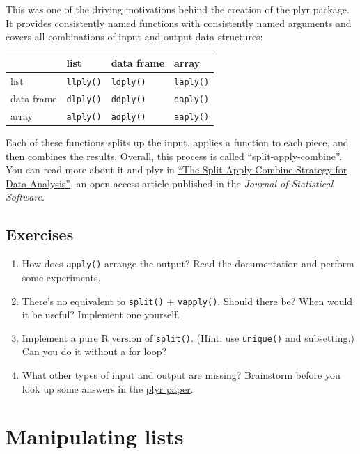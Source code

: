 This was one of the driving motivations behind the creation of the plyr
package. It provides consistently named functions with consistently
named arguments and covers all combinations of input and output data
structures:

\begin{longtable}[]{@{}llll@{}}
\toprule
& list & data frame & array\tabularnewline
\midrule
\endhead
list & \texttt{llply()} & \texttt{ldply()} &
\texttt{laply()}\tabularnewline
data frame & \texttt{dlply()} & \texttt{ddply()} &
\texttt{daply()}\tabularnewline
array & \texttt{alply()} & \texttt{adply()} &
\texttt{aaply()}\tabularnewline
\bottomrule
\end{longtable}

Each of these functions splits up the input, applies a function to each
piece, and then combines the results. Overall, this process is called
``split-apply-combine''. You can read more about it and plyr in
\href{http://www.jstatsoft.org/v40/i01/}{``The Split-Apply-Combine
Strategy for Data Analysis''}, an open-access article published in the
\emph{Journal of Statistical Software}.

\hypertarget{exercises-2}{%
\subsection{Exercises}\label{exercises-2}}

\begin{enumerate}
\def\labelenumi{\arabic{enumi}.}
\item
  How does \texttt{apply()} arrange the output? Read the documentation
  and perform some experiments.
\item
  There's no equivalent to \texttt{split()} + \texttt{vapply()}. Should
  there be? When would it be useful? Implement one yourself.
\item
  Implement a pure R version of \texttt{split()}. (Hint: use
  \texttt{unique()} and subsetting.) Can you do it without a for loop?
\item
  What other types of input and output are missing? Brainstorm before
  you look up some answers in the
  \href{http://www.jstatsoft.org/v40/i01/}{plyr paper}.
\end{enumerate}

\hypertarget{functionals-fp}{%
\section{Manipulating lists}\label{functionals-fp}}

